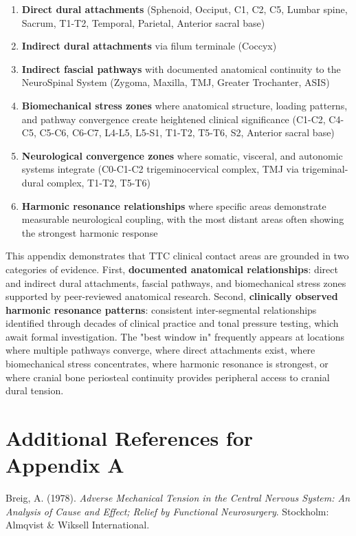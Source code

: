 \documentclass[11pt,letterpaper]{article}
\begin{document}
\begin{enumerate}
\item \textbf{Direct dural attachments} (Sphenoid, Occiput, C1, C2, C5, Lumbar spine, Sacrum, T1-T2, Temporal, Parietal, Anterior sacral base)
\item \textbf{Indirect dural attachments} via filum terminale (Coccyx)
\item \textbf{Indirect fascial pathways} with documented anatomical continuity to the NeuroSpinal System (Zygoma, Maxilla, TMJ, Greater Trochanter, ASIS)
\item \textbf{Biomechanical stress zones} where anatomical structure, loading patterns, and pathway convergence create heightened clinical significance (C1-C2, C4-C5, C5-C6, C6-C7, L4-L5, L5-S1, T1-T2, T5-T6, S2, Anterior sacral base)
\item \textbf{Neurological convergence zones} where somatic, visceral, and autonomic systems integrate (C0-C1-C2 trigeminocervical complex, TMJ via trigeminal-dural complex, T1-T2, T5-T6)
\item \textbf{Harmonic resonance relationships} where specific areas demonstrate measurable neurological coupling, with the most distant areas often showing the strongest harmonic response
\end{enumerate}

This appendix demonstrates that TTC clinical contact areas are grounded in two categories of evidence. First, \textbf{documented anatomical relationships}: direct and indirect dural attachments, fascial pathways, and biomechanical stress zones supported by peer-reviewed anatomical research. Second, \textbf{clinically observed harmonic resonance patterns}: consistent inter-segmental relationships identified through decades of clinical practice and tonal pressure testing, which await formal investigation. The "best window in" frequently appears at locations where multiple pathways converge, where direct attachments exist, where biomechanical stress concentrates, where harmonic resonance is strongest, or where cranial bone periosteal continuity provides peripheral access to cranial dural tension.


\section{Additional References for Appendix A}

Breig, A. (1978). \textit{Adverse Mechanical Tension in the Central Nervous System: An Analysis of Cause and Effect; Relief by Functional Neurosurgery}. Stockholm: Almqvist \& Wiksell International.
\end{document}
